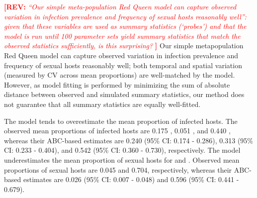 \documentclass{article}\usepackage[]{graphicx}\usepackage[]{color}
\newcommand{\comment}[3]{\textcolor{#1}{\textbf{[#2: }\textit{#3}\textbf{]}}}
\newcommand{\rev}[1]{\comment{red}{REV}{#1}}
\begin{document}
\rev{
“Our simple meta-population Red Queen model can capture observed variation in infection prevalence and frequency of sexual hosts reasonably well”: given that these variables are used as summary statistics (‘probes’) and that the model is run until 100 parameter sets yield summary statistics that match the observed statistics sufficiently, is this surprising?
}
Our simple metapopulation Red Queen model can capture observed variation in infection prevalence and frequency of sexual hosts reasonably well;
both temporal and spatial variation (measured by CV across mean proportions) are well-matched by the model. 
However, as model fitting is performed by minimizing the sum of absolute distance between observed and simulated summary statistics, our method does not guarantee that all summary statistics are equally well-fitted.

The model tends to overestimate the mean proportion of infected hosts.
The observed mean proportions of infected hosts are 0.175 \citep{dagan2013clonal}, 0.051 \citep{mckone2016fine}, and 0.440 \citep{vergara2014infection}, 
whereas their ABC-based estimates are 0.240 (95\% CI: 0.174 - 0.286), 0.313 (95\% CI: 0.233 - 0.404), and 0.542 (95\% CI: 0.360 - 0.730), respectively.
The model underestimates the mean proportion of sexual hosts for \cite{dagan2013clonal} and \cite{vergara2014infection}.
Observed mean proportions of sexual hosts are 0.045 and 0.704, respectively, whereas their ABC-based estimates are 0.026 (95\% CI: 0.007 - 0.048) and 0.596 (95\% CI: 0.441 - 0.679).
\end{document}
